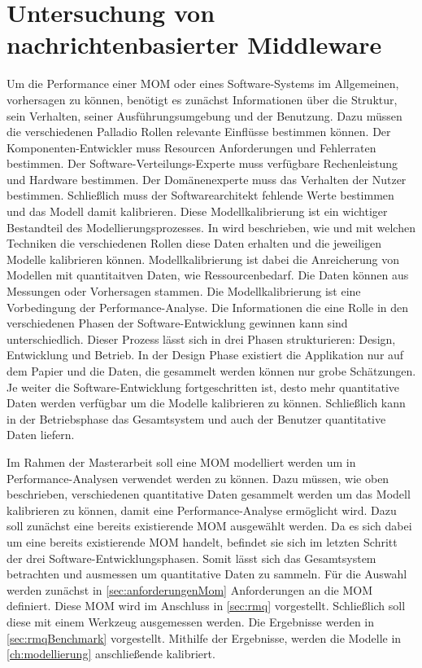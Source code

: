 

\chapter{Untersuchung von nachrichtenbasierter Middleware}
\label{ch:mom}
Um die Performance einer MOM oder eines Software-Systems im Allgemeinen, vorhersagen zu können, benötigt es zunächst Informationen über die Struktur, sein Verhalten, seiner Ausführungsumgebung und der Benutzung. Dazu müssen die verschiedenen Palladio Rollen relevante Einflüsse bestimmen können. Der Komponenten-Entwickler muss Resourcen Anforderungen und Fehlerraten bestimmen. Der Software-Verteilungs-Experte muss verfügbare Rechenleistung und Hardware bestimmen. Der Domänenexperte muss das Verhalten der Nutzer bestimmen. Schließlich muss der Softwarearchitekt fehlende Werte bestimmen und das Modell damit kalibrieren. Diese Modellkalibrierung ist ein wichtiger Bestandteil des Modellierungsprozesses. In \cite{palladio17} wird beschrieben, wie und mit welchen Techniken die verschiedenen Rollen diese Daten erhalten und die jeweiligen Modelle kalibrieren können. Modellkalibrierung ist dabei die Anreicherung von Modellen mit quantitaitven Daten, wie Ressourcenbedarf. Die Daten können aus Messungen oder Vorhersagen stammen. Die Modellkalibrierung ist eine Vorbedingung der Performance-Analyse. Die Informationen die eine Rolle in den verschiedenen Phasen der Software-Entwicklung gewinnen kann sind unterschiedlich. Dieser Prozess lässt sich in drei Phasen strukturieren: Design, Entwicklung und Betrieb. In der Design Phase existiert die Applikation nur auf dem Papier und die Daten, die gesammelt werden können nur grobe Schätzungen. Je weiter die Software-Entwicklung fortgeschritten ist, desto mehr quantitative Daten werden verfügbar um die Modelle kalibrieren zu können. Schließlich kann in der Betriebsphase das Gesamtsystem und auch der Benutzer quantitative Daten liefern. 

Im Rahmen der Masterarbeit soll eine MOM modelliert werden um in Performance-Analysen verwendet werden zu können. Dazu müssen, wie oben beschrieben, verschiedenen quantitative Daten gesammelt werden um das Modell kalibrieren zu können, damit eine Performance-Analyse ermöglicht wird. Dazu soll zunächst eine bereits existierende MOM ausgewählt werden. Da es sich dabei um eine bereits existierende MOM handelt, befindet sie sich im letzten Schritt der drei Software-Entwicklungsphasen. Somit lässt sich das Gesamtsystem betrachten und ausmessen um quantitative Daten zu sammeln. Für die Auswahl werden zunächst in \autoref{sec:anforderungenMom} Anforderungen an die MOM definiert. Diese MOM wird im Anschluss in \autoref{sec:rmq} vorgestellt. Schließlich soll diese mit einem Werkzeug ausgemessen werden. Die Ergebnisse werden in \autoref{sec:rmqBenchmark} vorgestellt. Mithilfe der Ergebnisse, werden die Modelle in \autoref{ch:modellierung} anschließende kalibriert.


